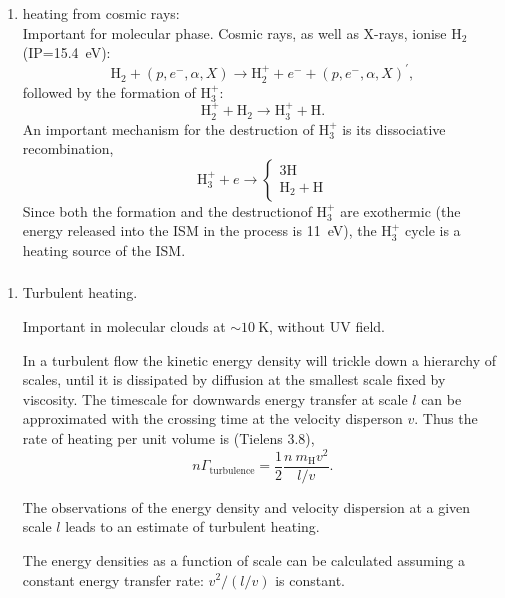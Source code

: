 \begin{frame}
\begin{enumerate}
\conti
\item heating from cosmic rays:\\
Important for molecular phase. Cosmic rays, as well as X-rays, ionise H$_2$ (IP=15.4~eV):
\[ \mathrm{H}_2 + (p,e^-,\alpha,X) \rightarrow \mathrm{H}_2^+ + e^- +  (p,e^-,\alpha,X)^\prime,
\]
followed by the formation of $\mathrm{H}_3^+$:
\[ \mathrm{H}_2^+ +   \mathrm{H}_2 \rightarrow \mathrm{H}_3^+ + \mathrm{H}. \]
An important mechanism for the destruction of H$_3^+$ is its
dissociative recombination,
\[ \mathrm{H}_3^+ + e \rightarrow \left\{ \begin{array}{c} 3\mathrm{H} \\
  \mathrm{H}_2 + \mathrm{H} \end{array} \right. \] Since both the
  formation and the destructionof H$_3^+$ are exothermic (the energy
  released into the ISM in the process is 11~eV), the 
  H$_3^+$ cycle is a heating source of the ISM.
\seti
\end{enumerate}

\end{frame} \begin{frame}\frametitle{}


\begin{enumerate}
\conti
\item Turbulent heating.

Important in molecular clouds at $\sim 10~$K, without UV field. 


In a turbulent flow the kinetic energy density will trickle down a
hierarchy of scales, until it is dissipated by diffusion at the
smallest scale fixed by viscosity. The timescale for downwards energy
transfer at scale $l$ can be approximated with the crossing time at
the velocity disperson $v$. Thus the rate of heating per unit volume
is (Tielens 3.8),
\[ n \Gamma_\mathrm{turbulence} = \frac{1}{2} \frac{n ~ m_\mathrm{H}
v^2}{l/v} . \]

The observations of the energy density and velocity dispersion at a
given scale $l$ leads to an estimate of turbulent heating. 

The energy densities as a function of scale can be calculated assuming
a constant energy transfer rate: $ v^2 / (l/v)$ is constant. 
\seti
\end{enumerate}

\end{frame} \begin{frame}\frametitle{}


\end{frame}

